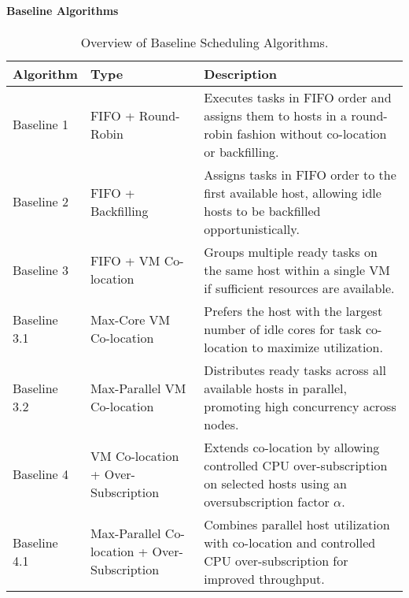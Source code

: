 \paragraph{Baseline Algorithms}
\label{sec:baseline_algorithms}
\begin{table}[H]
    \centering
    \caption{Overview of Baseline Scheduling Algorithms.}
    \label{tab:baseline_overview}
    \begin{tabularx}{\textwidth}{l l X}
        \toprule
        \textbf{Algorithm} & \textbf{Type}                                & \textbf{Description}                                                                                                          \\
        \midrule
        Baseline 1         & FIFO + Round-Robin                           & Executes tasks in FIFO order and assigns them to hosts in a round-robin fashion without co-location or backfilling.           \\

        Baseline 2         & FIFO + Backfilling                           & Assigns tasks in FIFO order to the first available host, allowing idle hosts to be backfilled opportunistically.              \\

        Baseline 3         & FIFO + VM Co-location                        & Groups multiple ready tasks on the same host within a single VM if sufficient resources are available.                        \\

        Baseline 3.1       & Max-Core VM Co-location                      & Prefers the host with the largest number of idle cores for task co-location to maximize utilization.                          \\

        Baseline 3.2       & Max-Parallel VM Co-location                  & Distributes ready tasks across all available hosts in parallel, promoting high concurrency across nodes.                      \\

        Baseline 4         & VM Co-location + Over-Subscription           & Extends co-location by allowing controlled CPU over-subscription on selected hosts using an oversubscription factor $\alpha$. \\

        Baseline 4.1       & Max-Parallel Co-location + Over-Subscription & Combines parallel host utilization with co-location and controlled CPU over-subscription for improved throughput.             \\
        \bottomrule
    \end{tabularx}
\end{table}

